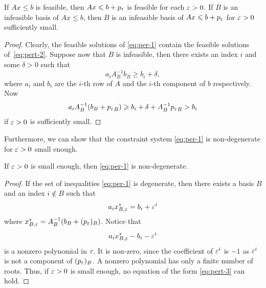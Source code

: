 \begin{lemma}
  \label{lem:per-2}
  If $Ax \leq b$ is feasible, then $ Ax \leqslant b + p_{\varepsilon} $ is feasible
  for each ${\varepsilon}>0$. If $B$ is an infeasible basis of $Ax \leq b$,
  then $B$ is an infeasible basis of $Ax \leqslant b + p_{\varepsilon}$ for ${\varepsilon}>0$
  sufficiently small.
\end{lemma}

\begin{proof}
  Clearly, the feasible  solutions of \eqref{eq:per-1} contain the feasible solutions of~\eqref{eq:pert-2}. Suppose now that $B$ is infeasible, then there exists an index $i$ and some $\delta>0$ such that 
  \begin{displaymath}
    a_i A_B^{-1}b_B \geq b_i + \delta,
  \end{displaymath}
  where $a_i$ and $b_i$ are the $i$-th row of $A$ and the $i$-th
  component of $b$ respectively. Now 
  \begin{displaymath}
    a_i A_B^{-1}(b_B + {p_{\varepsilon}}_B) \geqslant b_i + \delta + A_B^{-1}{p_{\varepsilon}}_B > b_i
  \end{displaymath}
  if ${\varepsilon}>0$ is sufficiently small. 
\end{proof}

Furthermore, we can show that the constraint system \eqref{eq:per-1} is non-degenerate for ${\varepsilon}>0$ small enough. 

\begin{lemma}
  \label{lem:pert-3}
  If ${\varepsilon}>0$ is small enough, then \eqref{eq:per-1} is non-degenerate. 
\end{lemma}

\begin{proof}
  If the set of  inequalities \eqref{eq:per-1} is degenerate, then there exists a basis $B$ and an index $i \notin B$ such that 
  \begin{equation}
    \label{eq:pert-3}
    a_ix^*_{B,{\varepsilon}} = b_i+{\varepsilon}^i
  \end{equation}
where $x^*_{B,{\varepsilon}} = A_B^{-1}(b_B + (p_{\varepsilon})_B)$. Notice that 
  \begin{displaymath}
    a_ix^*_{B,{\varepsilon}} - b_i - {\varepsilon}^i
  \end{displaymath}
  is a nonzero polynomial in ${\varepsilon}$. It is non-zero, since the coefficient of ${\varepsilon}^i$ is $-1$ as ${\varepsilon}^i$ is not a component of $(p_{\varepsilon})_B$. A nonzero polynomial has only a finite number of roots. Thus, if ${\varepsilon}>0$ is small enough, no equation of the form \eqref{eq:pert-3} can hold. 
\end{proof}

